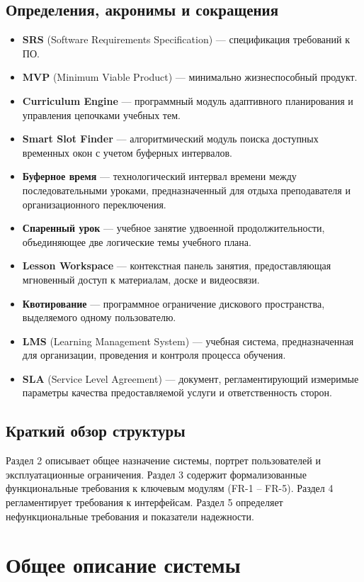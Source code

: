 \documentclass[12pt,a4paper]{article}
\begin{document}
\subsection{Определения, акронимы и сокращения}
\begin{itemize}
    \item \textbf{SRS} (Software Requirements Specification) — спецификация требований к ПО.
    \item \textbf{MVP} (Minimum Viable Product) — минимально жизнеспособный продукт.
    \item \textbf{Curriculum Engine} — программный модуль адаптивного планирования и управления цепочками учебных тем.
    \item \textbf{Smart Slot Finder} — алгоритмический модуль поиска доступных временных окон с учетом буферных интервалов.
    \item \textbf{Буферное время} — технологический интервал времени между последовательными уроками, предназначенный для отдыха преподавателя и организационного переключения.
    \item \textbf{Спаренный урок} — учебное занятие удвоенной продолжительности, объединяющее две логические темы учебного плана.
    \item \textbf{Lesson Workspace} — контекстная панель занятия, предоставляющая мгновенный доступ к материалам, доске и видеосвязи.
    \item \textbf{Квотирование} — программное ограничение дискового пространства, выделяемого одному пользователю.
    \item \textbf{LMS} (Learning Management System) — учебная система, предназначенная для организации, проведения и контроля процесса обучения.
    \item \textbf{SLA} (Service Level Agreement) — документ, регламентирующий измеримые параметры качества предоставляемой услуги и ответственность сторон.
\end{itemize}

\subsection{Краткий обзор структуры}
Раздел 2 описывает общее назначение системы, портрет пользователей и
эксплуатационные ограничения. Раздел 3 содержит формализованные функциональные
требования к ключевым модулям (FR-1 -- FR-5). Раздел 4 регламентирует требования
к интерфейсам. Раздел 5 определяет нефункциональные требования и показатели
надежности.

\section{Общее описание системы}
\end{document}
